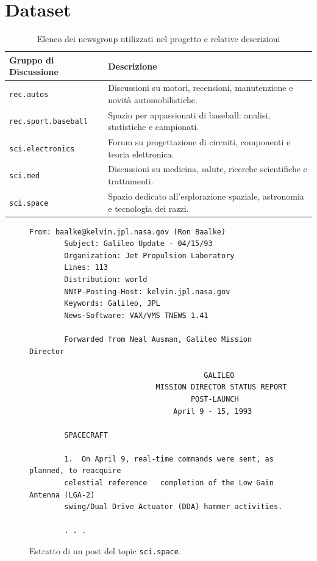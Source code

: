 \documentclass[12pt, a4paper, twoside]{article}
\numberwithin{table}{section}
\begin{document}
    \pagebreak
    \thispagestyle{plain}
    \section{Dataset}
    \label{sec:dataset}

    \begin{table}[t]
        \centering
        \begin{tabularx}{\textwidth}{lX}
            \toprule
            \textbf{Gruppo di Discussione} & \textbf{Descrizione} \\
            \midrule
            \texttt{rec.autos} & Discussioni su motori, recensioni, manutenzione e novità automobilistiche. \\
            \texttt{rec.sport.baseball} & Spazio per appassionati di baseball: analisi, statistiche e campionati. \\
            \texttt{sci.electronics} & Forum su progettazione di circuiti, componenti e teoria elettronica. \\
            \texttt{sci.med} & Discussioni su medicina, salute, ricerche scientifiche e trattamenti. \\
            \texttt{sci.space} & Spazio dedicato all'esplorazione spaziale, astronomia e tecnologia dei razzi. \\
            \bottomrule
        \end{tabularx}
        \caption{Elenco dei newsgroup utilizzati nel progetto e relative descrizioni}
        \label{tab:newsgroups}
    \end{table}

    \begin{figure}[t]
        \centering
        \begin{minipage}{\linewidth}
        \begin{lstlisting}[language={},basicstyle=\footnotesize\ttfamily]
        From: baalke@kelvin.jpl.nasa.gov (Ron Baalke)
        Subject: Galileo Update - 04/15/93
        Organization: Jet Propulsion Laboratory
        Lines: 113
        Distribution: world
        NNTP-Posting-Host: kelvin.jpl.nasa.gov
        Keywords: Galileo, JPL
        News-Software: VAX/VMS TNEWS 1.41    
        
        Forwarded from Neal Ausman, Galileo Mission Director
        
                                        GALILEO
                             MISSION DIRECTOR STATUS REPORT
                                     POST-LAUNCH
                                 April 9 - 15, 1993
        
        SPACECRAFT
        
        1.  On April 9, real-time commands were sent, as planned, to reacquire
        celestial reference   completion of the Low Gain Antenna (LGA-2)
        swing/Dual Drive Actuator (DDA) hammer activities.
        
        . . .
        \end{lstlisting}
        \end{minipage}
        \caption{Estratto di un post del topic \texttt{sci.space}.}
        \label{fig:post-example}
    \end{figure}
\end{document}
